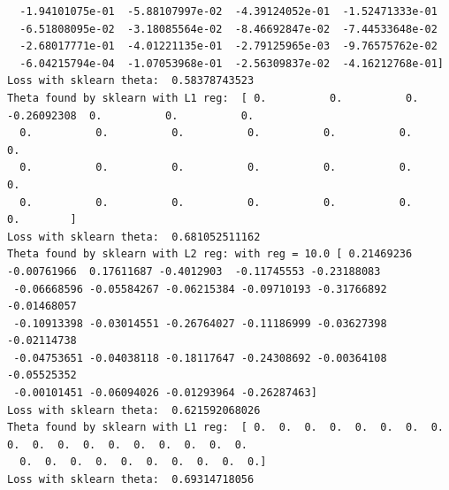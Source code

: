 \documentclass{article}
\begin{document}
\begin{tiny}
\begin{lstlisting}
  -1.94101075e-01  -5.88107997e-02  -4.39124052e-01  -1.52471333e-01
  -6.51808095e-02  -3.18085564e-02  -8.46692847e-02  -7.44533648e-02
  -2.68017771e-01  -4.01221135e-01  -2.79125965e-03  -9.76575762e-02
  -6.04215794e-04  -1.07053968e-01  -2.56309837e-02  -4.16212768e-01]
Loss with sklearn theta:  0.58378743523
Theta found by sklearn with L1 reg:  [ 0.          0.          0.         -0.26092308  0.          0.          0.
  0.          0.          0.          0.          0.          0.          0.
  0.          0.          0.          0.          0.          0.          0.
  0.          0.          0.          0.          0.          0.          0.        ]
Loss with sklearn theta:  0.681052511162
Theta found by sklearn with L2 reg: with reg = 10.0 [ 0.21469236 -0.00761966  0.17611687 -0.4012903  -0.11745553 -0.23188083
 -0.06668596 -0.05584267 -0.06215384 -0.09710193 -0.31766892 -0.01468057
 -0.10913398 -0.03014551 -0.26764027 -0.11186999 -0.03627398 -0.02114738
 -0.04753651 -0.04038118 -0.18117647 -0.24308692 -0.00364108 -0.05525352
 -0.00101451 -0.06094026 -0.01293964 -0.26287463]
Loss with sklearn theta:  0.621592068026
Theta found by sklearn with L1 reg:  [ 0.  0.  0.  0.  0.  0.  0.  0.  0.  0.  0.  0.  0.  0.  0.  0.  0.  0.
  0.  0.  0.  0.  0.  0.  0.  0.  0.  0.]
Loss with sklearn theta:  0.69314718056
\end{lstlisting}
\end{tiny}
\end{document}
